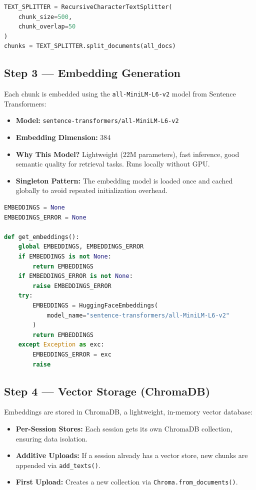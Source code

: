 \documentclass[12pt,a4paper]{article}
\begin{document}
\begin{lstlisting}[language=Python, caption={Text splitter configuration}]
TEXT_SPLITTER = RecursiveCharacterTextSplitter(
    chunk_size=500,
    chunk_overlap=50
)
chunks = TEXT_SPLITTER.split_documents(all_docs)
\end{lstlisting}

\subsection{Step 3 — Embedding Generation}

Each chunk is embedded using the \texttt{all-MiniLM-L6-v2} model from Sentence Transformers:

\begin{itemize}
  \item \textbf{Model:} \texttt{sentence-transformers/all-MiniLM-L6-v2}
  \item \textbf{Embedding Dimension:} 384
  \item \textbf{Why This Model?} Lightweight (22M parameters), fast inference, good semantic quality for retrieval tasks. Runs locally without GPU.
  \item \textbf{Singleton Pattern:} The embedding model is loaded once and cached globally to avoid repeated initialization overhead.
\end{itemize}

\begin{lstlisting}[language=Python, caption={Embedding initialization with caching}]
EMBEDDINGS = None
EMBEDDINGS_ERROR = None

def get_embeddings():
    global EMBEDDINGS, EMBEDDINGS_ERROR
    if EMBEDDINGS is not None:
        return EMBEDDINGS
    if EMBEDDINGS_ERROR is not None:
        raise EMBEDDINGS_ERROR
    try:
        EMBEDDINGS = HuggingFaceEmbeddings(
            model_name="sentence-transformers/all-MiniLM-L6-v2"
        )
        return EMBEDDINGS
    except Exception as exc:
        EMBEDDINGS_ERROR = exc
        raise
\end{lstlisting}

\subsection{Step 4 — Vector Storage (ChromaDB)}

Embeddings are stored in ChromaDB, a lightweight, in-memory vector database:

\begin{itemize}
  \item \textbf{Per-Session Stores:} Each session gets its own ChromaDB collection, ensuring data isolation.
  \item \textbf{Additive Uploads:} If a session already has a vector store, new chunks are appended via \texttt{add\_texts()}.
  \item \textbf{First Upload:} Creates a new collection via \texttt{Chroma.from\_documents()}.
\end{itemize}
\end{document}
